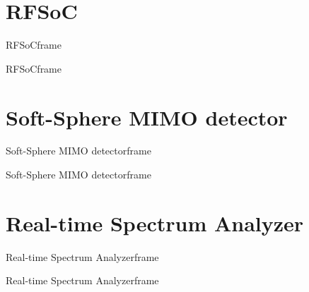 \section{RFSoC}
\begin{frame}{RFSoC}{frame}

\end{frame}
\begin{frame}{RFSoC}{frame}

\end{frame}
\section{Soft-Sphere MIMO detector}
\begin{frame}{Soft-Sphere MIMO detector}{frame}

\end{frame}
\begin{frame}{Soft-Sphere MIMO detector}{frame}

\end{frame}
\section{Real-time Spectrum Analyzer}
\begin{frame}{Real-time Spectrum Analyzer}{frame}

\end{frame}
\begin{frame}{Real-time Spectrum Analyzer}{frame}

\end{frame}



